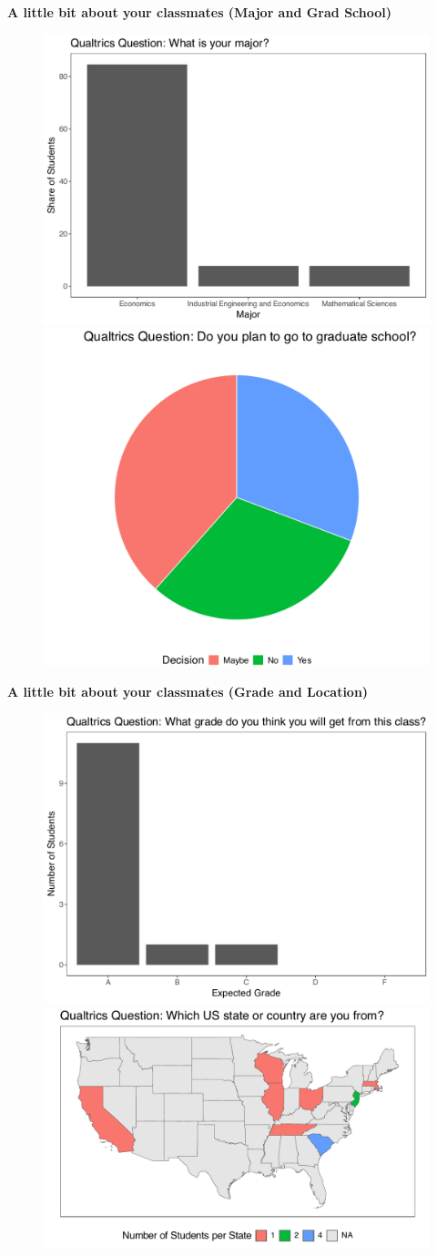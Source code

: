 \documentclass[11pt, aspectratio=169]{beamer}
\begin{document}
\begin{frame}{\bf \large A little bit about your classmates (Major and Grad School)}
	
	\begin{figure}[htbp!]
		\centering
		\includegraphics[width=0.54\linewidth]{figs/major_econ4050}\includegraphics[width=0.46\linewidth]{figs/gradschool_econ4050}
	\end{figure}
\end{frame}

\begin{frame}{\bf \large A little bit about your classmates (Grade and Location)}
	\begin{figure}[htb[!]
		\centering
		\includegraphics[width=0.46\linewidth]{figs/grade_econ4050}\includegraphics[width=0.54\linewidth]{figs/statemap_econ4050}
	\end{figure}
\end{frame}
\end{document}
